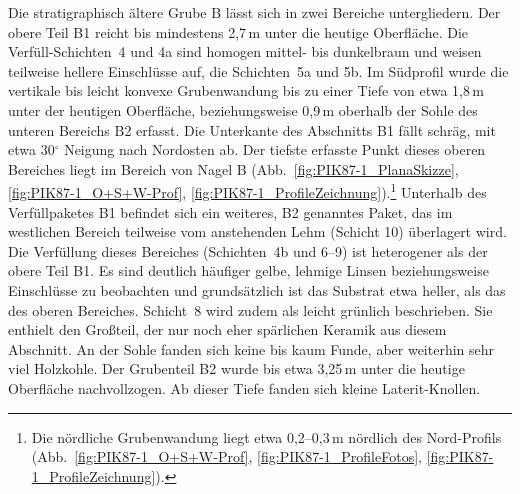 Die stratigraphisch ältere Grube B lässt sich in zwei Bereiche untergliedern. Der obere Teil B1 reicht bis mindestens 2,7\,m unter die heutige Oberfläche. Die Verfüll-Schichten~4 und 4a sind homogen mittel- bis dunkelbraun und weisen teilweise hellere Einschlüsse auf, die Schichten~5a und 5b. Im Südprofil wurde die vertikale bis leicht konvexe Grubenwandung bis zu einer Tiefe von etwa 1,8\,m unter der heutigen Oberfläche, beziehungsweise 0,9\,m oberhalb der Sohle des unteren Bereichs B2 erfasst. Die Unterkante des Abschnitts B1 fällt schräg, mit etwa 30$^\circ$ Neigung nach Nordosten ab. Der tiefste erfasste Punkt dieses oberen Bereiches liegt im Bereich von Nagel B (Abb.~\ref{fig:PIK87-1_PlanaSkizze}, \ref{fig:PIK87-1_O+S+W-Prof}, \ref{fig:PIK87-1_ProfileZeichnung}).\footnote{Die nördliche Grubenwandung liegt etwa 0,2--0,3\,m nördlich des Nord-Profils (Abb.~\ref{fig:PIK87-1_O+S+W-Prof}, \ref{fig:PIK87-1_ProfileFotos}, \ref{fig:PIK87-1_ProfileZeichnung}).} Unterhalb des Verfüllpaketes B1 befindet sich ein weiteres, B2 genanntes Paket, das im westlichen Bereich teilweise vom anstehenden Lehm (Schicht 10) überlagert wird. Die Verfüllung dieses Bereiches (Schichten~4b und 6--9) ist heterogener als der obere Teil B1. Es sind deutlich häufiger gelbe, lehmige Linsen beziehungsweise Einschlüsse zu beobachten und grundsätzlich ist das Substrat etwa heller, als das des oberen Bereiches. Schicht~8 wird zudem als leicht grünlich beschrieben. Sie enthielt den Großteil, der nur noch eher spärlichen Keramik aus diesem Abschnitt. An der Sohle fanden sich keine bis kaum Funde, aber weiterhin sehr viel Holzkohle. Der Grubenteil B2 wurde bis etwa 3,25\,m unter die heutige Oberfläche nachvollzogen. Ab dieser Tiefe fanden sich kleine Laterit-Knollen.

